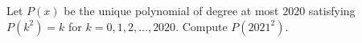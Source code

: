 Let $P(x)$ be the unique polynomial of degree at most $2020$ satisfying $P(k^2)=k$ for $k=0,1,2,\dots,2020$. Compute $P(2021^2)$.